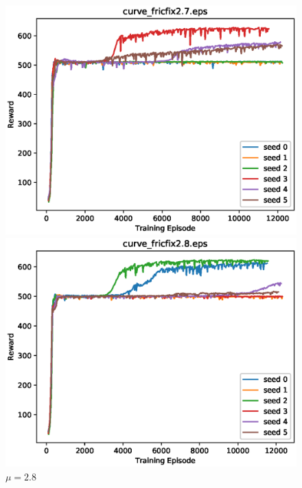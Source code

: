 \begin{figure}[p]
 \begin{minipage}{0.49\hsize}
  \begin{center}
 \includegraphics[width=.99\linewidth]{./fig/curve_fricfix2.7.eps}
  \caption{$\mu=2.7$
  }
  \end{center}
 \end{minipage}
 \begin{minipage}{0.49\hsize}
   \begin{center}
 \includegraphics[width=.99\linewidth]{./fig/curve_fricfix2.8.eps}
  \caption{$\mu=2.8$
     }
  \end{center}
 \end{minipage}
\end{figure}

